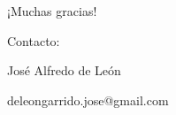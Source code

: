 \documentclass[xcolor=dvipsnames,presentation]{beamer}%
\begin{document}
\begin{frame}
  \begin{center}
    ¡Muchas gracias!

    \vfill

    Contacto:

    José Alfredo de León

    deleongarrido.jose@gmail.com
  \end{center}
\end{frame}
\end{document}
